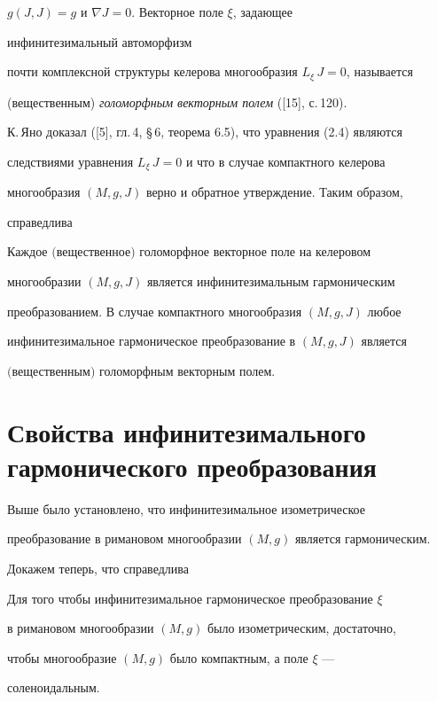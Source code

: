 $g(J,J)=g$ и $\nabla J=0$. Векторное поле $\xi$, задающее 


инфинитезимальный автоморфизм 


почти комплексной структуры келерова многообразия $L_\xi\,J=0$, называется 


(вещественным) {\it голоморфным векторным полем} ([15], с.\,120). 


 


К.\,Яно доказал ([5], гл.\,4, \S\,6, теорема 6.5), что уравнения (2.4) являются 


следствиями уравнения $L_\xi\,J=0$ и что в случае компактного келерова 


многообразия $(M,g,J)$ верно и обратное утверждение. Таким образом, 


справедлива 


 


\begin{thms} 


Каждое $($вещественное$)$ голоморфное векторное поле на келеровом 


многообразии $(M,g,J)$ является инфинитезимальным гармоническим 


преобразованием. В случае компактного многообразия $(M,g,J)$ любое 


инфинитезимальное гармоническое преобразование в $(M,g,J)$ является 


$($вещественным$)$ голоморфным векторным полем. 


\end{thms} 


 


 


\section{Свойства инфинитезимального гармонического преобразования} 


 


 


Выше было установлено, что инфинитезимальное изометрическое 


преобразование в римановом многообразии $(M,g)$ является гармоническим. 


Докажем теперь, что справедлива 


 


\begin{thms} 


Для того чтобы инфинитезимальное гармоническое преобразование $\xi$ 


в римановом многообразии $(M,g)$ было изометрическим, достаточно, 


чтобы многообразие $(M,g)$ было компактным, а поле $\xi$ --- 


соленоидальным. 


\end{thms} 


